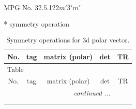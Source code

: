 \documentclass[fleqn,8pt]{jsarticle}
\begin{document}
\setcounter{MaxMatrixCols}{32}

\renewcommand{\tablename}{Table~}
\renewcommand{\figurename}{Figure~}
\begin{center}
\LARGE
MPG No. 32.5.122\quad$m'\bar{3}'m'$
\end{center}
* symmetry operation
\renewcommand{\arraystretch}{1.3}
\begin{longtable}{ccccc}
\caption{Symmetry operations for 3d polar vector.}
 \\
 \hline \hline
No. & tag & matrix (polar) & det & TR \\ \hline \endfirsthead

\multicolumn{4}{l}{\tablename\ \thetable{}} \\
 \hline \hline
No. & tag & matrix (polar) & det & TR \\ \hline \endhead

 \hline \hline
\multicolumn{4}{r}{\footnotesize\it continued ...} \\ \endfoot

 \hline \hline
\multicolumn{4}{r}{} \\ \endlastfoot


\end{longtable}
\end{document}
